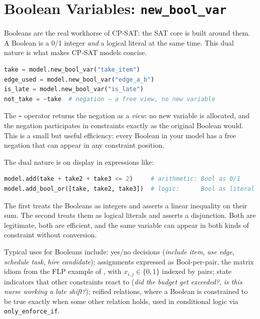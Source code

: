 \section{\texorpdfstring{Boolean Variables: \texttt{new\_bool\_var}}{Boolean Variables: new\_bool\_var}}\label{sec:6.2}

Booleans are the real workhorse of CP-SAT: the SAT core is built
around them. A Boolean is a 0/1 integer \emph{and} a logical literal at
the same time. This dual nature is what makes CP-SAT models concise.

\begin{lstlisting}[language=Python]
take = model.new_bool_var("take_item")
edge_used = model.new_bool_var("edge_a_b")
is_late = model.new_bool_var("is_late")
not_take = ~take  # negation — a free view, no new variable
\end{lstlisting}

The \lstinline!~! operator returns the negation as a
\emph{view}: no new variable is allocated, and the negation participates
in constraints exactly as the original Boolean would. This is a small
but useful efficiency: every Boolean in your model has a free
negation that can appear in any constraint position.

The dual nature is on display in expressions like:

\begin{lstlisting}[language=Python]
model.add(take + take2 + take3 <= 2)     # arithmetic: Bool as 0/1
model.add_bool_or([take, take2, take3])  # logic:      Bool as literal
\end{lstlisting}

The first treats the Booleans as integers and asserts a linear
inequality on their sum. The second treats them as logical literals and
asserts a disjunction. Both are legitimate, both are efficient, and the
same variable can appear in both kinds of constraint without conversion.

Typical uses for Booleans include: yes/no decisions (\emph{include
item}, \emph{use edge}, \emph{schedule task}, \emph{hire candidate});
assignments expressed as Bool-per-pair, the matrix idiom from the FLP
example of , with \(x_{i,j} \in \{0, 1\}\) indexed by pairs; state
indicators that other constraints react to (\emph{did the budget get
exceeded?}, \emph{is this nurse working a late shift?}); reified
relations, where a Boolean is constrained to be true exactly when some
other relation holds, used in conditional logic via
\lstinline!only_enforce_if!.

